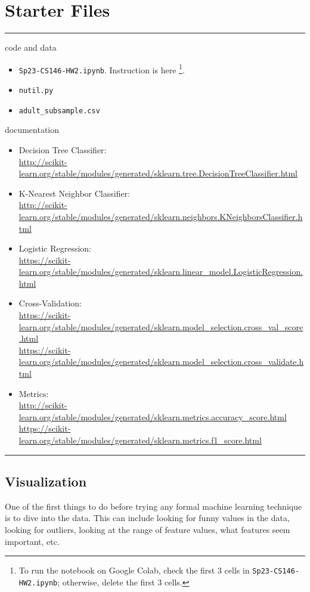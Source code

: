 \documentclass[11pt]{article}
\begin{document}
\section*{Starter Files}
\vspace{-\baselineskip}
\rule{\textwidth}{1pt}
code and data
\begin{itemize}[nolistsep]
    \item \verb|Sp23-CS146-HW2.ipynb|. Instruction is here \footnote{ To run the notebook on Google Colab, check the first 3 cells in \verb|Sp23-CS146-HW2.ipynb|; otherwise, delete the first 3 cells.}.
    \item \verb|nutil.py|
    \item \verb|adult_subsample.csv|
\end{itemize}
documentation
\begin{itemize}[nolistsep]
\item Decision Tree Classifier: \\{\footnotesize \url{http://scikit-learn.org/stable/modules/generated/sklearn.tree.DecisionTreeClassifier.html}}
\item K-Nearest Neighbor Classifier: \\{\footnotesize \url{http://scikit-learn.org/stable/modules/generated/sklearn.neighbors.KNeighborsClassifier.html}} 
\item Logistic Regression: \\{\footnotesize \url{https://scikit-learn.org/stable/modules/generated/sklearn.linear_model.LogisticRegression.html}}
\item Cross-Validation: \\{\footnotesize \url{https://scikit-learn.org/stable/modules/generated/sklearn.model_selection.cross_val_score.html}} \\
{\footnotesize \url{https://scikit-learn.org/stable/modules/generated/sklearn.model_selection.cross_validate.html}}
\item Metrics: \\{\footnotesize \url{http://scikit-learn.org/stable/modules/generated/sklearn.metrics.accuracy_score.html}}\\
{\footnotesize \url{https://scikit-learn.org/stable/modules/generated/sklearn.metrics.f1_score.html}}
\end{itemize}
\vspace{-\baselineskip}
\rule{\textwidth}{1pt}


\subsection*{Visualization}
One of the first things to do before trying any formal machine learning technique is to dive into the data. This can include looking for funny values in the data, looking for outliers, looking at the range of feature values, what features seem important, etc.
\end{document}
